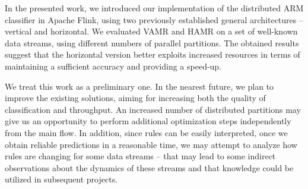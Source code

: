 \documentclass[journal]{IEEEtran}
\begin{document}
In the presented work, we introduced our implementation of the distributed ARM classifier in Apache Flink, using two previously established general architectures -- vertical and horizontal. We evaluated VAMR and HAMR on a set of well-known data streams, using different numbers of parallel partitions. The obtained results suggest that the horizontal version better exploits increased resources in terms of maintaining a sufficient accuracy and providing a speed-up.

We treat this work as a preliminary one. In the nearest future, we plan to improve the existing solutions, aiming for increasing both the quality of classification and throughput. An increased number of distributed partitions may give us an opportunity to perform additional optimization steps independently from the main flow. In addition, since rules can be easily interpreted, once we obtain reliable predictions in a reasonable time, we may attempt to analyze how rules are changing for some data streams -- that may lead to some indirect observations about the dynamics of these streams and that knowledge could be utilized in subsequent projects.



\end{document}
